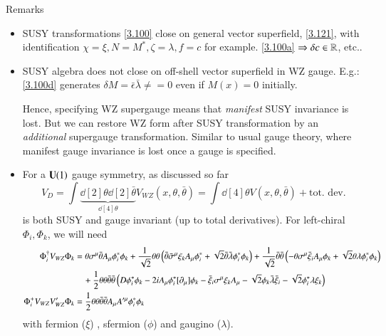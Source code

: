 Remarks
\begin{itemize}
   \item SUSY transformations \eqref{3.100} close on general vector superfield, \eqref{3.121}, with identification $\chi = \xi, N = M^*, \zeta = \lambda, f=c$ for example. \eqref{3.100a} $\Rightarrow \delta c \in \mathbb{R}$, etc..
   \item SUSY algebra does not close on off-shell vector superfield in WZ gauge. E.g.: \eqref{3.100d} generates $\delta M = \bar\epsilon \bar\lambda \neq = 0$ even if $M(x) = 0$ initially.

      Hence, specifying WZ supergauge means that \textit{manifest} SUSY invariance is lost. But we can restore WZ form after SUSY transformation by an \textit{additional} supergauge transformation. Similar to usual gauge theory, where manifest gauge invariance is lost once a gauge is specified.
   \item For a $\mathbf{U}(1)$ gauge symmetry, as discussed so far
      \begin{equation*}
         V_D = \int \underbrace{\dd[2]{\theta} \dd[2]{\bar\theta}}_{\dd[4]{\theta}} V_{WZ} (x, \theta, \bar\theta) = \int \dd[4]{\theta} V(x, \theta, \bar\theta) + \text{tot. dev.}
      \end{equation*}
      is both SUSY and gauge invariant (up to total derivatives). For left-chiral $\Phi_i, \Phi_k$, we will need
      \begin{subequations}
         \label{3.129}
      \begin{align}
         \Phi_i^\dagger V_{WZ} \Phi_k &= \theta \sigma^\mu \bar\theta A_\mu \phi_i^* \phi_k + \frac{1}{\sqrt{2}} \theta \theta \left( \bar\theta \bar\sigma^\mu \xi_k A_\mu \phi_i^* + \sqrt{2} \bar\theta \bar\lambda \phi_i^* \phi_k \right)  + \frac{1}{\sqrt{2}} \bar\theta \bar\theta \left( - \theta \sigma^\mu \bar\xi_i A_\mu \phi_k + \sqrt{2} \theta\lambda \phi_i^* \phi_k \right) \notag \\
                                      &\quad + \frac{1}{2} \theta \theta \bar\theta \bar\theta \left( D \phi_i^* \phi_k - 2i A_\mu \phi_i^* [\partial_\mu] \phi_k - \bar\xi_i \sigma^\mu \xi_k A_\mu - \sqrt{2} \phi_k \bar\lambda \bar\xi_i - \sqrt{2} \phi_i^* \lambda \xi_k \right) \label{3.129a} \\
         \Phi_i^+ V_{WZ} V'_{WZ} \Phi_k &= \frac{1}{2} \theta \theta \bar\theta \bar\theta A_\mu A'^{\mu} \phi_i^* \phi_k \label{3.129b}
      \end{align}
      \end{subequations}
      with fermion ($\xi$) , sfermion ($\phi$) and gaugino ($\lambda$).
\end{itemize}

